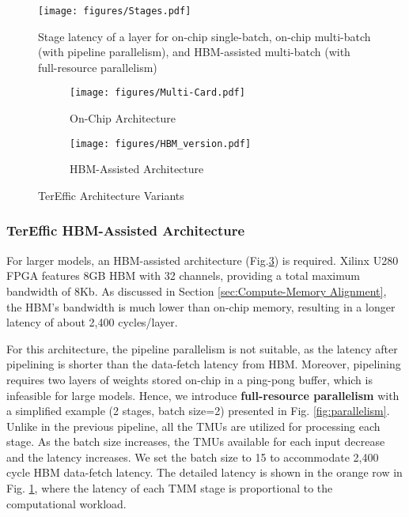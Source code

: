 \begin{figure}
    \centering
    \texttt{[image: figures/Stages.pdf]}
    \caption{Stage latency of a layer for on-chip single-batch, on-chip multi-batch (with pipeline parallelism), and HBM-assisted multi-batch (with full-resource parallelism)}
    \label{fig:stages}
    \vspace{-4mm}
\end{figure}


\begin{figure}
    \centering
    \begin{subfigure}[b]{0.23\textwidth} 
        \centering
        \texttt{[image: figures/Multi-Card.pdf]} 
        \caption{On-Chip Architecture}
        \label{fig:multi-card}
        \vspace{-1mm}
    \end{subfigure} 
    \begin{subfigure}[b]{0.23\textwidth} 
        \centering
        \texttt{[image: figures/HBM\_version.pdf]}  
        \caption{HBM-Assisted Architecture}
        \vspace{-1mm}
        \label{fig:HBM}
    \end{subfigure}
    \caption{TerEffic Architecture Variants}
    \label{fig:single batch}
    \vspace{-6mm}
\end{figure}
\subsubsection{TerEffic  HBM-Assisted Architecture}
\label{sec:HBM-Assisted Architecture}
For larger models, an HBM-assisted architecture (Fig.\ref{fig:HBM}) is required. Xilinx U280 FPGA features 8GB HBM with 32 channels, providing a total maximum bandwidth of 8Kb. As discussed in Section \ref{sec:Compute-Memory Alignment}, the HBM's bandwidth is much lower than on-chip memory, resulting in a longer latency of about 2,400 cycles/layer. 

For this architecture, the pipeline parallelism is not suitable, as the latency after pipelining is shorter than the data-fetch latency from HBM. Moreover, pipelining requires two layers of weights stored on-chip in a ping-pong buffer, which is infeasible for large models. Hence, we introduce \textbf{full-resource parallelism} with a simplified example (2 stages, batch size=2) presented in Fig. \ref{fig:parallelism}. Unlike in the previous pipeline, all the TMUs are utilized for processing each stage. As the batch size increases, the TMUs available for each input decrease and the latency increases. We set the batch size to 15 to accommodate 2,400 cycle HBM data-fetch latency. The detailed latency is shown in the orange row in Fig. \ref{fig:stages}, where the latency of each TMM stage is proportional to the computational workload.


